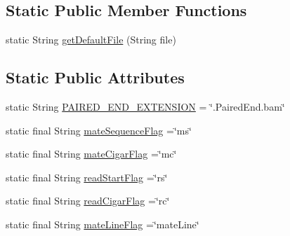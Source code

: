 \subsection*{Static Public Member Functions}
\begin{DoxyCompactItemize}
\item 
static String \hyperlink{classumms_1_1core_1_1writers_1_1_paired_end_writer_a1c122086a58a6837457e7b63eef0cb14}{get\+Default\+File} (String file)
\end{DoxyCompactItemize}
\subsection*{Static Public Attributes}
\begin{DoxyCompactItemize}
\item 
static String \hyperlink{classumms_1_1core_1_1writers_1_1_paired_end_writer_a47179fdb22f7088adbe4f3261169a073}{P\+A\+I\+R\+E\+D\+\_\+\+E\+N\+D\+\_\+\+E\+X\+T\+E\+N\+S\+I\+O\+N} = \char`\"{}.Paired\+End.\+bam\char`\"{}
\item 
static final String \hyperlink{classumms_1_1core_1_1writers_1_1_paired_end_writer_a309aa28eba64f3d1db4dc03b7d52a571}{mate\+Sequence\+Flag} =\char`\"{}ms\char`\"{}
\item 
static final String \hyperlink{classumms_1_1core_1_1writers_1_1_paired_end_writer_a1d3bbf405e811cac7e24b8a52007e027}{mate\+Cigar\+Flag} =\char`\"{}mc\char`\"{}
\item 
static final String \hyperlink{classumms_1_1core_1_1writers_1_1_paired_end_writer_ad1befee1e7c0717e31504e8290e34924}{read\+Start\+Flag} =\char`\"{}rs\char`\"{}
\item 
static final String \hyperlink{classumms_1_1core_1_1writers_1_1_paired_end_writer_a9cb1bbd483adac9d696ce15ce4472900}{read\+Cigar\+Flag} =\char`\"{}rc\char`\"{}
\item 
static final String \hyperlink{classumms_1_1core_1_1writers_1_1_paired_end_writer_a836d5879ccb102f95c318813393a8fb6}{mate\+Line\+Flag} =\char`\"{}mate\+Line\char`\"{}
\end{DoxyCompactItemize}


